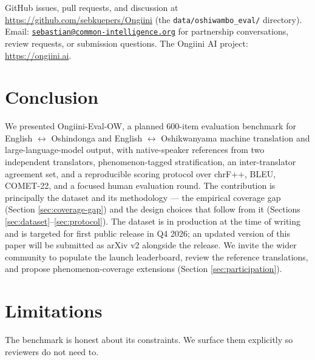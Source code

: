 \documentclass[11pt]{article}
\begin{document}
GitHub issues, pull requests, and discussion at
\url{https://github.com/sebkuepers/Ongiini} (the
\texttt{data/oshiwambo\_eval/} directory).
Email: \href{mailto:sebastian@common-intelligence.org}{\texttt{sebastian@common-intelligence.org}} for
partnership conversations, review requests, or submission
questions. The Ongiini AI project:
\url{https://ongiini.ai}.

\section{Conclusion}
\label{sec:conclusion}

We presented Ongiini-Eval-OW, a planned 600-item evaluation
benchmark for English $\leftrightarrow$ Oshindonga and English
$\leftrightarrow$ Oshikwanyama machine translation and
large-language-model output, with native-speaker references from
two independent translators, phenomenon-tagged stratification, an
inter-translator agreement set, and a reproducible scoring
protocol over chrF++, BLEU, COMET-22, and a focused human
evaluation round. The contribution is principally the dataset and
its methodology --- the empirical coverage gap (Section
\ref{sec:coverage-gap}) and the design choices that follow from it
(Sections \ref{sec:dataset}--\ref{sec:protocol}). The dataset is
in production at the time of writing and is targeted for first
public release in Q4 2026; an updated version of this paper will be
submitted as arXiv v2 alongside the release. We invite the wider
community to populate the launch leaderboard, review the reference
translations, and propose phenomenon-coverage extensions
(Section \ref{sec:participation}).

\section*{Limitations}
\label{sec:limitations}

The benchmark is honest about its constraints. We surface them
explicitly so reviewers do not need to.
\end{document}
